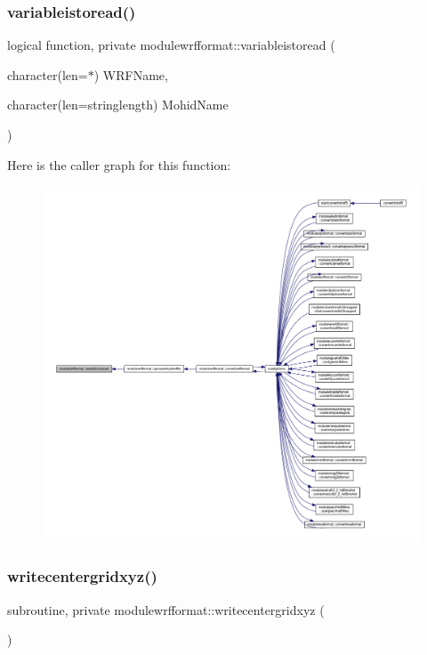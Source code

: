 \subsubsection{\texorpdfstring{variableistoread()}{variableistoread()}}
{\footnotesize\ttfamily logical function, private modulewrfformat\+::variableistoread (\begin{DoxyParamCaption}\item[{character(len=$\ast$)}]{W\+R\+F\+Name,  }\item[{character(len=stringlength)}]{Mohid\+Name }\end{DoxyParamCaption})\hspace{0.3cm}{\ttfamily [private]}}

Here is the caller graph for this function\+:\nopagebreak
\begin{figure}[H]
\begin{center}
\leavevmode
\includegraphics[width=350pt]{namespacemodulewrfformat_a39704adb6d59858e48b9581c11a17870_icgraph}
\end{center}
\end{figure}
\mbox{\label{namespacemodulewrfformat_a731fdf35a2c828689a5ab27bc57be092}} 
\subsubsection{\texorpdfstring{writecentergridxyz()}{writecentergridxyz()}}
{\footnotesize\ttfamily subroutine, private modulewrfformat\+::writecentergridxyz (\begin{DoxyParamCaption}{ }\end{DoxyParamCaption})\hspace{0.3cm}{\ttfamily [private]}}


